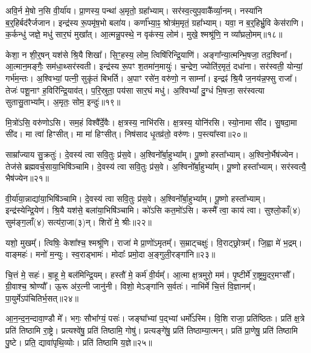 अवि॒र्न मे॒षो न॒सि वी॒र्या॑य।
प्रा॒णस्य॒ पन्था॑ अ॒मृतो॒ ग्रहा᳚भ्याम्।
सर॑स्व॒त्युप॒वाकै᳚र्व्या॒नम्।
नस्या॑नि ब॒र्॒हिर्बद॑रैर्जजान।
इन्द्र॑स्य रू॒पमृ॑ष॒भो बला॑य।
कर्णा᳚भ्या॒ꣴ॒ श्रोत्र॑म॒मृतं॒ ग्रहा᳚भ्याम्।
यवा॒ न ब॒र्॒हिर्भ्रु॒वि केस॑राणि।
क॒र्कन्धु॑ जज्ञे॒ मधु॑ सार॒घं मुखा᳚त्।
आ॒त्मन्नु॒पस्थे॒ न वृक॑स्य॒ लोम॑।
मुखे॒ श्मश्रू॑णि॒ न व्या᳚घ्रलो॒मम्॥१८॥\ip

केशा॒ न शी॒र्॒षन्‌ यश॑से श्रि॒यै शिखा᳚।
सि॒ꣳ॒हस्य॒ लोम॒ त्विषि॑रिन्द्रि॒याणि॑।
अङ्गा᳚न्या॒त्मन्भि॒षजा॒ तद॒श्विना᳚।
आ॒त्मान॒मङ्गैः॒ सम॑धा॒थ्सर॑स्वती।
इन्द्र॑स्य रू॒पꣳ श॒तमा॑न॒मायुः॑।
च॒न्द्रेण॒ ज्योति॑र॒मृतं॒ दधा॑ना।
सर॑स्वती॒ योन्यां॒ गर्भ॑म॒न्तः।
अ॒श्विभ्यां॒ पत्नी॒ सुकृ॑तं बिभर्ति।
अ॒पाꣳ रसे॑न॒ वरु॑णो॒ न साम्ना᳚।
इन्द्रꣴ॑ श्रि॒यै ज॒नय॑न्न॒फ्सु राजा᳚।
तेजः॑ पशू॒नाꣳ ह॒विरि॑न्द्रि॒याव॑त्।
प॒रि॒स्रुता॒ पय॑सा सार॒घं मधु॑।
अ॒श्विभ्यां᳚ दु॒ग्धं भि॒षजा॒ सर॑स्वत्या सुतासु॒ताभ्या᳚म्।
अ॒मृतः॒ सोम॒ इन्दुः॑॥१९॥\ip\anuvakamend[अन्त॑र आ॒राद॒न्तर्व॑साते व्याघ्रलो॒मꣳ राजा॑ च॒त्वारि॑ च]

मि॒त्रो॑ऽसि॒ वरु॑णोऽसि।
सम॒हं विश्वै᳚र्दे॒वैः।
क्ष॒त्रस्य॒ नाभि॑रसि।
क्ष॒त्रस्य॒ योनि॑रसि।
स्यो॒नामा सी॑द।
सु॒षदा॒मा सी॑द।
मा त्वा॑ हिꣳसीत्।
मा मा॑ हिꣳसीत्।
निष॑साद धृ॒तव्र॑तो॒ वरु॑णः।
प॒स्त्या᳚स्वा॥२०॥\ip

साम्रा᳚ज्याय सु॒क्रतुः॑।
दे॒वस्य॑ त्वा सवि॒तुः प्र॑स॒वे।
अ॒श्विनो᳚र्बा॒हुभ्या᳚म्।
पू॒ष्णो हस्ता᳚भ्याम्।
अ॒श्विनो॒र्भैष॑ज्येन।
तेज॑से ब्रह्मवर्च॒साया॒भिषि॑ञ्चामि।
दे॒वस्य॑ त्वा सवि॒तुः प्र॑स॒वे।
अ॒श्विनो᳚र्बा॒हुभ्या᳚म्।
पू॒ष्णो हस्ता᳚भ्याम्।
सर॑स्वत्यै॒ भैष॑ज्येन॥२१॥\ip

वी॒र्या॑या॒न्नाद्या॑या॒भिषि॑ञ्चामि।
दे॒वस्य॑ त्वा सवि॒तुः प्र॑स॒वे।
अ॒श्विनो᳚र्बा॒हुभ्या᳚म्।
पू॒ष्णो हस्ता᳚भ्याम्।
इन्द्र॑स्येन्द्रि॒येण॑।
श्रि॒यै यश॑से॒ बला॑या॒भिषि॑ञ्चामि।
को॑ऽसि कत॒मो॑ऽसि।
कस्मै᳚ त्वा॒ काय॑ त्वा।
सुश्लो॒काँ(४) सुम॑ङ्ग॒लाँ(४) सत्य॑रा॒जा(३)न्।
शिरो॑ मे॒ श्रीः॥२२॥\ip

यशो॒ मुखम्᳚।
त्विषिः॒ केशा᳚श्च॒ श्मश्रू॑णि।
राजा॑ मे प्रा॒णो॑\-ऽमृतम्᳚।
स॒म्राट्चक्षुः॑।
वि॒राट्छ्रोत्रम्᳚।
जि॒ह्वा मे॑ भ॒द्रम्।
वाङ्महः॑।
मनो॑ म॒न्युः।
स्व॒राड्भामः॑।
मोदाः᳚ प्रमो॒दा अ॒ङ्गुली॒रङ्गा॑नि॥२३॥\ip

चि॒त्तं मे॒ सहः॑।
बा॒हू मे॒ बल॑मिन्द्रि॒यम्।
हस्तौ॑ मे॒ कर्म॑ वी॒र्यम्᳚।
आ॒त्मा क्ष॒त्रमुरो॒ मम॑।
पृ॒ष्टीर्मे॑ रा॒ष्ट्रमु॒दर॒मꣳसौ᳚।
ग्री॒वाश्च॒ श्रोण्यौ᳚।
ऊ॒रू अ॑र॒त्नी जानु॑नी।
विशो॒ मेऽङ्गा॑नि स॒र्वतः॑।
नाभि॑र्मे चि॒त्तं वि॒ज्ञानम्᳚।
पा॒युर्मे\-ऽप॑चितिर्भ॒सत्॥२४॥\ip

आ॒न॒न्द॒न॒न्दावा॒ण्डौ मे᳚।
भगः॒ सौभा᳚ग्यं॒ पसः॑।
जङ्घा᳚भ्यां प॒द्भ्यां धर्मो᳚\-ऽस्मि।
वि॒शि राजा॒ प्रति॑\-ष्ठितः।
प्रति॑ क्ष॒त्रे प्रति॑ तिष्ठामि रा॒ष्ट्रे।
प्रत्यश्वे॑षु॒ प्रति॑ तिष्ठामि॒ गोषु॑।
प्रत्यङ्गे॑षु॒ प्रति॑ तिष्ठाम्या॒त्मन्।
प्रति॑ प्रा॒णेषु॒ प्रति॑ तिष्ठामि पु॒ष्टे।
प्रति॒ द्यावा॑पृथि॒व्योः।
प्रति॑ तिष्ठामि य॒ज्ञे॥२५॥\ip

